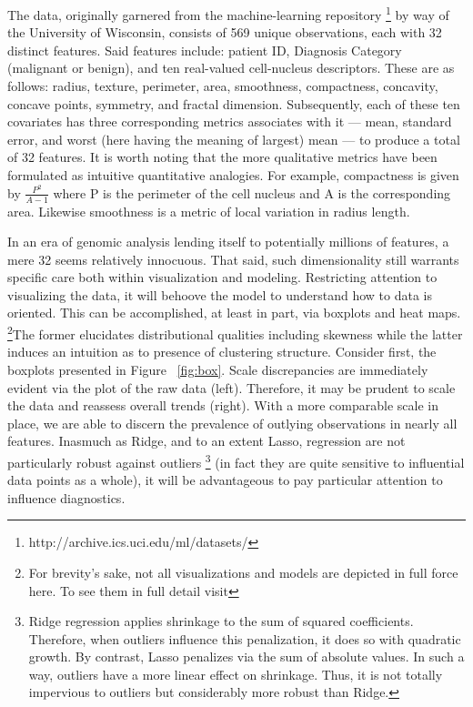 \documentclass[10pt]{article}
\begin{document}
The data, originally garnered from the machine-learning repository \footnote{http://archive.ics.uci.edu/ml/datasets/} by way of the University of Wisconsin, consists of 569 unique observations, each with 32 distinct features.  Said features include:  patient ID, Diagnosis Category (malignant or benign), and ten real-valued cell-nucleus descriptors.  These are as follows: radius, texture, perimeter, area, smoothness, compactness, concavity, concave points, symmetry, and fractal dimension.  Subsequently, each of these ten covariates has three corresponding metrics associates with it — mean, standard error, and worst (here having the meaning of largest) mean — to produce a total of 32 features.  It is worth noting that the more qualitative metrics have been formulated as intuitive quantitative analogies.  For example, compactness is given by $\frac{P^2}{A-1}$ where P is the perimeter of the cell nucleus and A is the corresponding area.  Likewise smoothness is a metric of local variation in radius length.  

	
	In an era of genomic analysis lending itself to potentially millions of features, a mere 32 seems relatively innocuous.  That said, such dimensionality still warrants specific care both within visualization and modeling.  Restricting attention to visualizing the data, it will behoove the model to understand how to data is oriented.  This can be accomplished, at least in part, via boxplots and heat maps.  \footnote{For brevity's sake, not all visualizations and models are depicted in full force here.  To see them in full detail visit }The former elucidates distributional qualities including skewness while the latter induces an intuition as to presence of clustering structure.  Consider first, the boxplots presented in Figure 	~\ref{fig:box}.  Scale discrepancies are immediately evident via the plot of the raw data (left).  Therefore, it may be prudent to scale the data and reassess overall trends (right).  With a more comparable scale in place, we are able to discern the prevalence of outlying observations in nearly all features.  Inasmuch as Ridge, and to an extent Lasso, regression are not particularly robust against outliers \footnote {Ridge regression applies shrinkage to the sum of squared coefficients.  Therefore, when outliers influence this penalization, it does so with quadratic growth.  By contrast, Lasso penalizes via the sum of absolute values.  In such a way, outliers have a more linear effect on shrinkage.  Thus, it is not totally impervious to outliers but considerably more robust than Ridge.} (in fact they are quite sensitive to influential data points as a whole), it will be advantageous to pay particular attention to influence diagnostics.  
	
\end{document}
